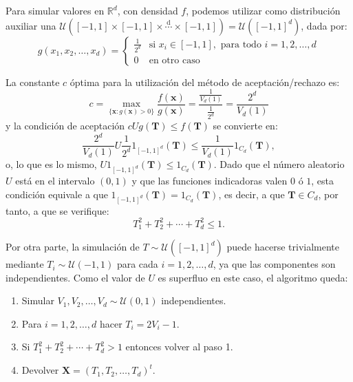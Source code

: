 \documentclass[
]{book}
\theoremstyle{break}
\theoremstyle{definition}
\theoremstyle{definition}
\theoremstyle{definition}
\theoremstyle{remark}
\begin{document}
Para simular valores en \(\mathbb{R}^{d}\), con densidad \(f\),
podemos utilizar como distribución auxiliar una
\(\mathcal{U}\left( \left[ -1,1\right] \times\left[ -1,1\right] \times\overset{\text{d}}{\cdots}\times\left[ -1,1\right] \right) = \mathcal{U}\left( \left[ -1,1\right]^{d}\right)\), dada por:
\[g\left( x_1,x_2,\ldots,x_d\right)  =\left\{
\begin{array}{ll}
\frac{1}{2^{d}} & \text{si } x_i\in\left[  -1,1\right], \text{ para todo }
i=1,2,\ldots,d\\
0 &  \text{en otro caso}
\end{array}\right.\]

La constante \(c\) óptima para la utilización del método de
aceptación/rechazo es:
\[c=\max_{\{\mathbf{x}:g\left( \mathbf{x}\right) > 0\}}
\frac{f\left( \mathbf{x}\right)  }{g\left( \mathbf{x}\right)  }
=\frac{\frac{1}{V_d\left( 1\right)  }}{\frac{1}{2^{d}}}
=\frac{2^{d}}{V_d\left( 1\right)}\]
y la condición de aceptación \(cUg\left( \mathbf{T}\right) \leq f\left( \mathbf{T}\right)\) se convierte en:
\[\frac{2^{d}}{V_d\left( 1\right)  }U\frac{1}{2^{d}}1_{\left[  -1,1\right]
^{d}}\left( \mathbf{T}\right)  \leq\frac{1}{V_d\left( 1\right)
}1_{C_d}\left( \mathbf{T}\right),\]
o, lo que es lo mismo, \(U1_{\left[ -1,1\right]^{d}}\left( \mathbf {T}\right) \leq1_{C_d}\left( \mathbf{T}\right)\).
Dado que el número aleatorio \(U\) está en el intervalo \((0,1)\) y que las funciones
indicadoras valen \(0\) ó \(1\), esta condición equivale a que \(1_{\left[ -1,1\right] ^{d}}\left( \mathbf{T}\right) =1_{C_d}\left( \mathbf{T}\right)\), es decir, a que
\(\mathbf{T}\in C_d\), por tanto, a que se verifique:
\[T_1^2+T_2^2+\cdots+T_d^2\leq1.\]

Por otra parte, la simulación de \(T \sim \mathcal{U}\left( \left[ -1,1\right] ^{d}\right)\) puede hacerse trivialmente mediante
\(T_i \sim \mathcal{U}\left( -1, 1 \right)\)
para cada \(i=1,2,\ldots,d\), ya que las
componentes son independientes. Como el valor de \(U\) es superfluo en
este caso, el algoritmo queda:

\begin{enumerate}
\def\labelenumi{\arabic{enumi}.}
\item
  Simular \(V_1,V_2,\ldots,V_d \sim \mathcal{U}\left( 0,1\right)\) independientes.
\item
  Para \(i = 1, 2, \ldots, d\) hacer \(T_i = 2V_i - 1\).
\item
  Si \(T_1^2 + T_2^2 + \cdots + T_d^2 > 1\) entonces volver al paso 1.
\item
  Devolver \(\mathbf{X} = \left( T_1, T_2, \ldots, T_d \right)^t\).
\end{enumerate}
\end{document}
